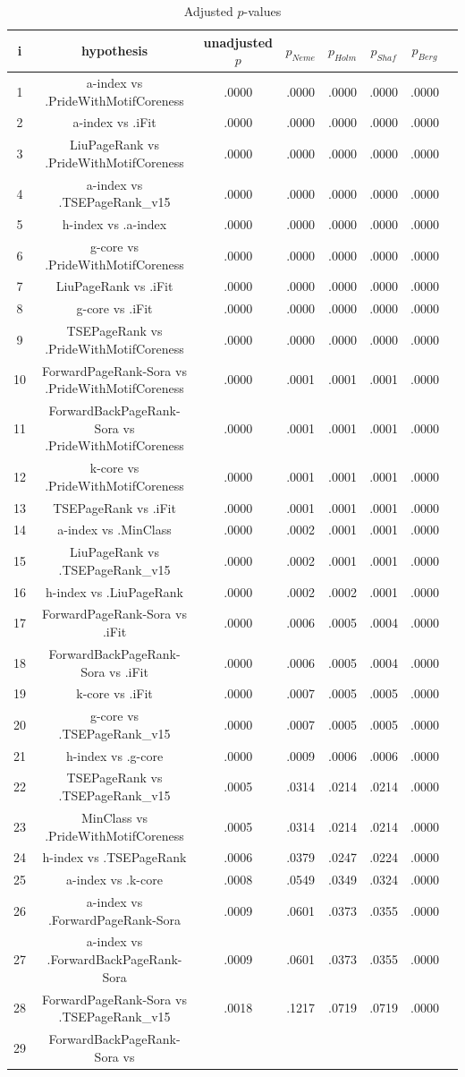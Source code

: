 \documentclass[a4paper,10pt]{article}
\begin{document}
\begin{landscape}
\begin{table}[!htp]
\centering\tiny
\caption{Adjusted $p$-values}
\begin{tabular}{cccccccc}
i&hypothesis&unadjusted $p$&$p_{Neme}$&$p_{Holm}$&$p_{Shaf}$&$p_{Berg}$\\
\hline
1&a-index vs .PrideWithMotifCoreness&.0000&.0000&.0000&.0000&.0000\\2&a-index vs .iFit&.0000&.0000&.0000&.0000&.0000\\3&LiuPageRank vs .PrideWithMotifCoreness&.0000&.0000&.0000&.0000&.0000\\4&a-index vs .TSEPageRank_v15&.0000&.0000&.0000&.0000&.0000\\5&h-index vs .a-index&.0000&.0000&.0000&.0000&.0000\\6&g-core vs .PrideWithMotifCoreness&.0000&.0000&.0000&.0000&.0000\\7&LiuPageRank vs .iFit&.0000&.0000&.0000&.0000&.0000\\8&g-core vs .iFit&.0000&.0000&.0000&.0000&.0000\\9&TSEPageRank vs .PrideWithMotifCoreness&.0000&.0000&.0000&.0000&.0000\\10&ForwardPageRank-Sora vs .PrideWithMotifCoreness&.0000&.0001&.0001&.0001&.0000\\11&ForwardBackPageRank-Sora vs .PrideWithMotifCoreness&.0000&.0001&.0001&.0001&.0000\\12&k-core vs .PrideWithMotifCoreness&.0000&.0001&.0001&.0001&.0000\\13&TSEPageRank vs .iFit&.0000&.0001&.0001&.0001&.0000\\14&a-index vs .MinClass&.0000&.0002&.0001&.0001&.0000\\15&LiuPageRank vs .TSEPageRank_v15&.0000&.0002&.0001&.0001&.0000\\16&h-index vs .LiuPageRank&.0000&.0002&.0002&.0001&.0000\\17&ForwardPageRank-Sora vs .iFit&.0000&.0006&.0005&.0004&.0000\\18&ForwardBackPageRank-Sora vs .iFit&.0000&.0006&.0005&.0004&.0000\\19&k-core vs .iFit&.0000&.0007&.0005&.0005&.0000\\20&g-core vs .TSEPageRank_v15&.0000&.0007&.0005&.0005&.0000\\21&h-index vs .g-core&.0000&.0009&.0006&.0006&.0000\\22&TSEPageRank vs .TSEPageRank_v15&.0005&.0314&.0214&.0214&.0000\\23&MinClass vs .PrideWithMotifCoreness&.0005&.0314&.0214&.0214&.0000\\24&h-index vs .TSEPageRank&.0006&.0379&.0247&.0224&.0000\\25&a-index vs .k-core&.0008&.0549&.0349&.0324&.0000\\26&a-index vs .ForwardPageRank-Sora&.0009&.0601&.0373&.0355&.0000\\27&a-index vs .ForwardBackPageRank-Sora&.0009&.0601&.0373&.0355&.0000\\28&ForwardPageRank-Sora vs .TSEPageRank_v15&.0018&.1217&.0719&.0719&.0000\\29&ForwardBackPageRank-Sora vs 
\end{tabular}
\end{table}
\end{landscape}
\end{document}

